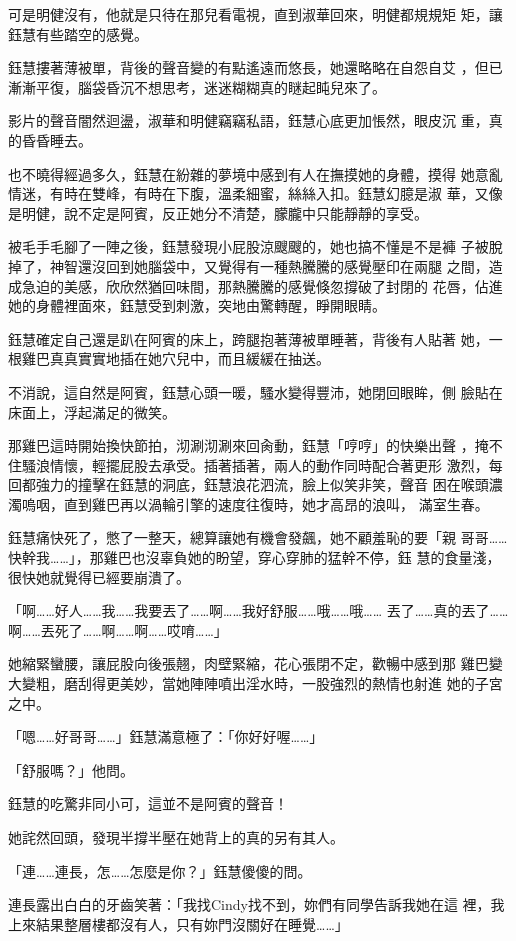 可是明健沒有，他就是只待在那兒看電視，直到淑華回來，明健都規規矩
矩，讓鈺慧有些踏空的感覺。

鈺慧摟著薄被單，背後的聲音變的有點遙遠而悠長，她還略略在自怨自艾
，但已漸漸平復，腦袋昏沉不想思考，迷迷糊糊真的瞇起盹兒來了。

影片的聲音闇然迴盪，淑華和明健竊竊私語，鈺慧心底更加悵然，眼皮沉
重，真的昏昏睡去。

也不曉得經過多久，鈺慧在紛雜的夢境中感到有人在撫摸她的身體，摸得
她意亂情迷，有時在雙峰，有時在下腹，溫柔細蜜，絲絲入扣。鈺慧幻臆是淑
華，又像是明健，說不定是阿賓，反正她分不清楚，朦朧中只能靜靜的享受。

被毛手毛腳了一陣之後，鈺慧發現小屁股涼颼颼的，她也搞不懂是不是褲
子被脫掉了，神智還沒回到她腦袋中，又覺得有一種熱騰騰的感覺壓印在兩腿
之間，造成急迫的美感，欣欣然猶回味間，那熱騰騰的感覺倏忽撐破了封閉的
花唇，佔進她的身體裡面來，鈺慧受到刺激，突地由驚轉醒，睜開眼睛。

鈺慧確定自己還是趴在阿賓的床上，跨腿抱著薄被單睡著，背後有人貼著
她，一根雞巴真真實實地插在她穴兒中，而且緩緩在抽送。

不消說，這自然是阿賓，鈺慧心頭一暖，騷水變得豐沛，她閉回眼眸，側
臉貼在床面上，浮起滿足的微笑。

那雞巴這時開始換快節拍，沏涮沏涮來回肏動，鈺慧「哼哼」的快樂出聲
，掩不住騷浪情懷，輕擺屁股去承受。插著插著，兩人的動作同時配合著更形
激烈，每回都強力的撞擊在鈺慧的洞底，鈺慧浪花泗流，臉上似笑非笑，聲音
困在喉頭濃濁嗚咽，直到雞巴再以渦輪引擎的速度往復時，她才高昂的浪叫，
滿室生春。

鈺慧痛快死了，憋了一整天，總算讓她有機會發飆，她不顧羞恥的要「親
哥哥……快幹我……」，那雞巴也沒辜負她的盼望，穿心穿肺的猛幹不停，鈺
慧的食量淺，很快她就覺得已經要崩潰了。

「啊……好人……我……我要丟了……啊……我好舒服……哦……哦……
丟了……真的丟了……啊……丟死了……啊……啊……哎唷……」

她縮緊蠻腰，讓屁股向後張翹，肉壁緊縮，花心張閉不定，歡暢中感到那
雞巴變大變粗，磨刮得更美妙，當她陣陣噴出淫水時，一股強烈的熱情也射進
她的子宮之中。

「嗯……好哥哥……」鈺慧滿意極了：「你好好喔……」

「舒服嗎？」他問。

鈺慧的吃驚非同小可，這並不是阿賓的聲音！

她詫然回頭，發現半撐半壓在她背上的真的另有其人。

「連……連長，怎……怎麼是你？」鈺慧傻傻的問。

連長露出白白的牙齒笑著：「我找Cindy找不到，妳們有同學告訴我她在這
裡，我上來結果整層樓都沒有人，只有妳門沒關好在睡覺……」

